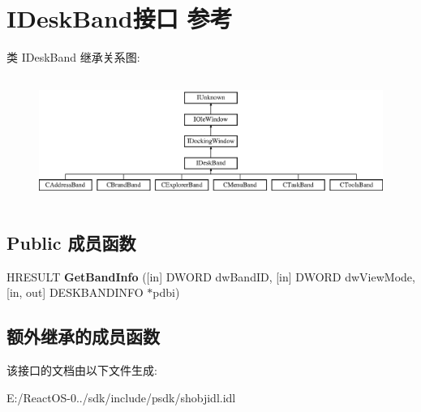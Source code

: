 \hypertarget{interface_i_desk_band}{}\section{I\+Desk\+Band接口 参考}
\label{interface_i_desk_band}
类 I\+Desk\+Band 继承关系图\+:\begin{figure}[H]
\begin{center}
\leavevmode
\includegraphics[height=4.129793cm]{interface_i_desk_band}
\end{center}
\end{figure}
\subsection*{Public 成员函数}
\begin{DoxyCompactItemize}
\item 
\mbox{\label{interface_i_desk_band_a88cf0503d95a8108405928fac32a09b2}} 
H\+R\+E\+S\+U\+LT {\bfseries Get\+Band\+Info} (\mbox{[}in\mbox{]} D\+W\+O\+RD dw\+Band\+ID, \mbox{[}in\mbox{]} D\+W\+O\+RD dw\+View\+Mode, \mbox{[}in, out\mbox{]} D\+E\+S\+K\+B\+A\+N\+D\+I\+N\+FO $\ast$pdbi)
\end{DoxyCompactItemize}
\subsection*{额外继承的成员函数}


该接口的文档由以下文件生成\+:\begin{DoxyCompactItemize}
\item 
E\+:/\+React\+O\+S-\/0../sdk/include/psdk/shobjidl.\+idl\end{DoxyCompactItemize}
